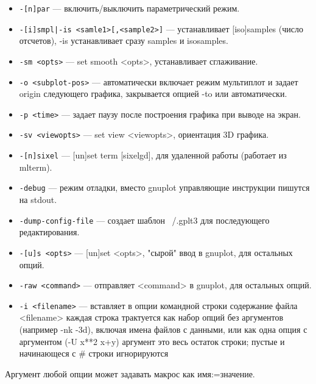 \documentclass[12pt]{article}
\begin{document}
\begin{itemize}
\item \verb'-[n]par' --- включить/выключить параметрический режим.
\item \verb'-[i]smpl|-is <samle1>[,<sample2>]' --- устанавливает [iso]samples (число отсчетов), 
                                     -is устанавливает сразу samples и isosamples.
\item \verb'-sm <opts>' --- set smooth <opts>,  устанавливает сглаживание.
\item \verb'-o <subplot-pos>' --- автоматически включает режим мультиплот и задает origin 
   следующего графика, закрывается опцией -to или автоматически.
\item \verb'-p <time>' --- задает паузу после построения графика при выводе на экран.
\item \verb'-sv <viewopts>' --- set view <viewopts>, ориентация 3D графика.
\item \verb'-[n]sixel' --- [un]set term [sixelgd], для удаленной работы (работает из mlterm).
\item \verb'-debug' --- режим отладки, вместо gnuplot управляющие инструкции пишутся на stdout.
\item \verb'-dump-config-file' --- создает шаблон ~/.gplt3 для последующего редактирования.
\item \verb'-[u]s <opts>' --- [un]set <opts>,  "сырой" ввод в gnuplot, для остальных опций.
\item \verb'-raw <command>' --- отправляет <command> в gnuplot, для остальных опций.
\item \verb'-i <filename>' --- вставляет в опции командной строки содержание файла <filename>
   каждая строка трактуется как набор опций без аргументов (например -nk -3d), 
   включая имена файлов с данными, или как одна опция с аргументом (-U x**2 x+y)
   аргумент это весь остаток строки; пустые и начинающеся с \# строки игнорируются
\end{itemize}
Аргумент любой опции может задавать макрос как имя:=значение.


\newpage
\end{document}
